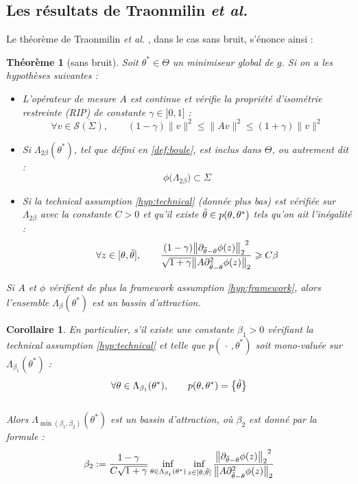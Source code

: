 \documentclass[hidelinks, french]{article} %
\renewcommand{\leq}{\leqslant}
\renewcommand{\geq}{\geqslant}
\newcommand{\etal}{\textit{et al. }}
\theoremstyle{enonce}
\newtheorem{theoreme}{Théorème}
\newtheorem{corollaire}{\qquad Corollaire}[theoreme]
\theoremstyle{special}
\theoremstyle{rq}
\theoremstyle{exo}
\theoremstyle{demo}
\begin{document}
\subsection{Les résultats de Traonmilin {\itshape et al.}}\label{sec:article2/2}

Le théorème de Traonmilin \etal, dans le cas sans bruit, s'énonce ainsi :
\\
\begin{theoreme}[sans bruit]\label{theo:maintheo} Soit $\theta^*\in\Theta$ un minimiseur global de $g$. Si on a les hypothèses suivantes :
	\begin{itemize}
		\item L'opérateur de mesure $A$ est continue et vérifie la \emph{propriété d'isométrie restreinte} (RIP) de constante $\gamma\in]0,1]$ :
		\begin{equation}\label{eq:RIP}
			\forall v\in\overline{\mathcal{S}(\Sigma)},\qquad (1-\gamma)\|v\|^2\leq \|Av\|^2\leq (1+\gamma)\|v\|^2
		\end{equation}
		
		\item Si $\Lambda_{2\beta}(\theta^*)$, tel que défini en \ref{def:boule}, est inclus dans $\Theta$, ou autrement dit :
		\begin{equation}\label{eq:LambinTheta}
			\phi\big(\Lambda_{2\beta}\big)\subset\Sigma
		\end{equation}
		
		\item Si la \emph{technical assumption} \ref{hyp:technical} (donnée plus bas) est vérifiée sur $\Lambda_{2\beta}$ avec la constante $C>0$ et qu'il existe $\Tilde{\theta}\in p(\theta,\theta^*)$ tels qu'on ait l'inégalité :
		\begin{equation}\label{eq:majo3}
			\forall z\in[\theta,\Tilde{\theta}],\qquad \frac{(1-\gamma){\big\|\partial_{\Tilde{\theta}-\theta}\phi(z)\big\|_2}^2}{\sqrt{1+\gamma}\big\|A\partial^2_{\Tilde{\theta}-\theta}\phi(z)\big\|_2}\geq C\beta
		\end{equation}
	\end{itemize}
	
	Si $A$ et $\phi$ vérifient de plus la \emph{framework assumption} \ref{hyp:framework}, alors l'ensemble $\Lambda_\beta(\theta^*)$ est un bassin d'attraction.  
\end{theoreme}

\begin{corollaire}
	En particulier, s'il existe une constante $\beta_1>0$ vérifiant la \emph{technical assumption} \ref{hyp:technical} et telle que $p(\,\cdot\,, \theta^*)$ soit mono-valuée sur $\Lambda_{\beta_1}(\theta^*)$ :
	\[\forall \theta\in\Lambda_{\beta_1}(\theta^*),\qquad p(\theta,\theta^*)=\big\{\Tilde{\theta}\big\}\]
	\\
	Alors $\Lambda_{\min(\beta_1,\beta_2)}(\theta^*)$ est un bassin d'attraction, où $\beta_2$ est donné par la formule :
	\[\beta_2:=\frac{1-\gamma}{C\sqrt{1+\gamma}}\inf_{\theta\in\Lambda_{\beta_1}(\theta^*)}\inf_{z\in[\theta,\Tilde{\theta}]}\frac{{\big\|\partial_{\Tilde{\theta}-\theta}\phi(z)\big\|_2}^2}{\big\|A\partial^2_{\Tilde{\theta}-\theta}\phi(z)\big\|_2}\]
\end{corollaire}
\end{document}
